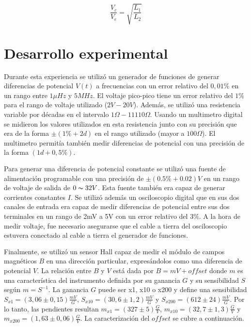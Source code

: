 \documentclass[11pt,a4paper]{article}
\begin{document}
\begin{equation}
\frac{V_c}{V_e}= \sqrt{\frac{L_1}{L_2}}
\label{trans_3}
\end{equation}




\section{Desarrollo experimental}

Durante esta experiencia se utilizó un generador de funciones de generar diferencias de potencial $V(t)$ a frecuencias con un error relativo del $0,01\%$ en un rango entre $1\mu Hz$ y $5MHz$. El voltaje pico-pico tiene un error relativo del $1\%$ para el rango de voltaje utilizado ($2V-20V$). Además, se utilizó una resistencia variable por décadas en el intervalo $1\Omega-11110\Omega$. Usando un multimetro digital se midieron los valores utilizados en esta resistencia junto con su precisión que era de la forma $\pm(1\%+2d)$ en el rango utilizado (mayor a $100\Omega$). El multimetro permitía también medir diferencias de potencial con una precisión de la forma $(1d+0,5\%)$.

Para generar una diferencia de potencial constante se utilizó una fuente de alimentación programable con una precisión de $\pm (0.5\% + 0.02)V$ en un rango de voltaje de salida de $0 \thicksim 32 V$. Esta fuente también era capaz de generar corrientes constantes $I$. Se utilizó además un osciloscopio digital que en sus dos canales de entrada era capaz de medir diferencias de potencial entre sus dos terminales en un rango de 2mV a 5V con un error relativo del $3\%$. A la hora de medir voltaje, fue necesario asegurarse que el cable a tierra del osciloscopio estuvera conectado al cable a tierra el generador de funciones. 

Finalmente, se utilizó un sensor Hall capaz de medir el módulo de campos magnéticos $B$ en una dirección particular, expresándolos como una diferencia de potencial $V$. La relación entre $B$ y $V$ está dada por $B = mV+offset$ donde $m$ es una característica del instrumento definida por su ganancia $G$ y su sensibilidad $S$ según $m = S^{-1}$. La ganancia $G$ puede ser x1, x10 o x200 y define una sensibilidad $S_{x1} = (3,06 \pm 0,15)\frac{mV}{G}$,  $S_{x10} = (30,6 \pm 1,2)\frac{mV}{G}$ y $S_{x200} = (612 \pm 24)\frac{mV}{G}$. Por lo tanto, las pendientes resultan $m_{x1} = (327 \pm 5)\frac{G}{V}$, $m_{x10} = (32,7 \pm 1,3)\frac{G}{V}$ y $m_{x200} = (1,63 \pm 0,06)\frac{G}{V}$. La caracterización del $offset$ se cubre a continuación.
\end{document}
